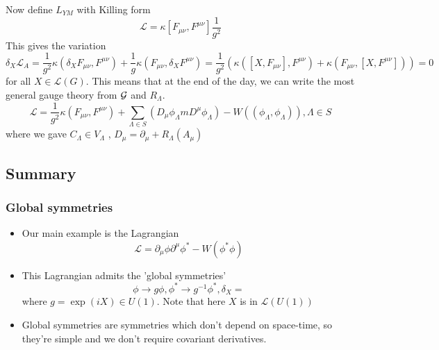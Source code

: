 Now define $ L _{ Y M } $ with Killing form 
\[
 \mathcal{ L }  = \kappa \left[  F _{ \mu \nu } , F ^{ \mu \nu }  \right]  \frac{1}{g ^  2} 
\] This gives the variation 
\[
 \delta _ X \mathcal{ L } _ A  = \frac{1}{g ^ 2 } 
 \kappa \left( \delta _ X F _{ \mu \nu } , F ^{ \mu \nu }  \right)  
 + \frac{1}{g } \kappa \left( F _{ \mu \nu } , \delta _ X F ^{ \mu \nu }  \right)  = \frac{1}{ g ^ 2 } \left( \kappa \left( \left[  X , F _{ \mu \nu }  \right]  , F ^{ \mu \nu }  \right)  + \kappa \left( F _{ \mu \nu } , 
 \left[  X , F ^{ \mu \nu }  \right] \right)   \right)   = 0
\]  for all $ X \in \mathcal{ L } \left( G   \right)  $. 
This means that at the end of the day, we 
can write the most general gauge theory
from $ \mathcal{ G } $ and $ R _{ \Lambda } $. 
\[
	\mathcal{ L }  = \frac{1}{g ^ 2 } \kappa \left( F _{ \mu \nu } , F ^{ \mu \nu }  \right) + \sum _{ \Lambda \in S } \left( D _ \mu \phi _{ \Lambda} m D ^ \mu \phi _{ \Lambda }  \right)   - W \left( \left( \phi _{ \Lambda } , 
	\phi _{ \Lambda} \right)   \right)  , \Lambda \in S 
\] where we gave $ C _{ \Lambda } \in V _{ \Lambda } $ , $ D _ \mu  = \partial  _ \mu + R _{ \Lambda } \left( A _\mu  \right)  $

\pagebreak
\subsection*{Summary}

\subsubsection*{Global symmetries}
\begin{itemize}
	\item Our main example is the Lagrangian 
		\[
			\mathcal{ L }  = \partial  _ \mu \phi \partial  ^ \mu \phi ^ *  - W ( \phi ^ * \phi  )
		\] 
	\item This Lagrangian admits the 'global symmetries' 
		\[
		 \phi \to g \phi, \phi ^ * \to g ^{ - 1} \phi ^ *, 
		 \delta_X = 
	 \] where $ g = \exp\left(  i X \right)  \in U \left(  1  \right) $. 
	 Note that here $ X $ is in $ \mathcal{ L }\left(  U \left( 1  \right)  \right)  $
	\item Global symmetries are symmetries 
		which don't depend on space-time, so they're 
		simple and we don't require covariant derivatives.  
\end{itemize}

